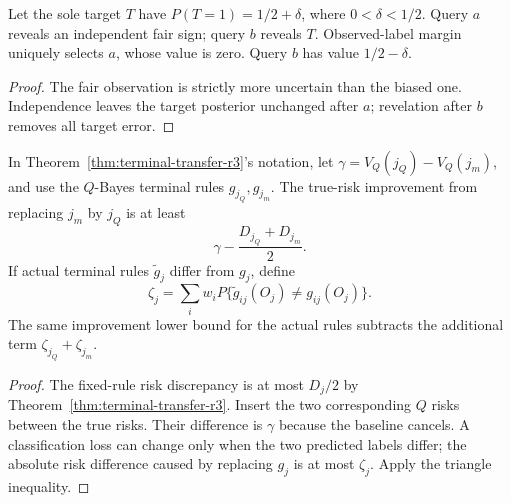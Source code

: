 \begin{counterexample}
Let the sole target $T$ have $P(T=1)=1/2+\delta$, where $0<\delta<1/2$.
Query $a$ reveals an independent fair sign; query $b$ reveals $T$.
Observed-label margin uniquely selects $a$, whose value is zero.
Query $b$ has value $1/2-\delta$.
\end{counterexample}
\begin{proof}
The fair observation is strictly more uncertain than the biased one.
Independence leaves the target posterior unchanged after $a$; revelation
after $b$ removes all target error.
\end{proof}

\begin{proposition}
\label{prop:improvement-r3}
In Theorem~\ref{thm:terminal-transfer-r3}'s notation, let
$\gamma=V_Q(j_Q)-V_Q(j_m)$, and use the $Q$-Bayes terminal rules
$g_{j_Q},g_{j_m}$. The true-risk improvement from replacing $j_m$ by
$j_Q$ is at least
\[
 \gamma-\frac{D_{j_Q}+D_{j_m}}2.
\]
If actual terminal rules $\widetilde g_j$ differ from $g_j$, define
\[
 \zeta_j=\sum_iw_iP\{\widetilde g_{ij}(O_j)\ne g_{ij}(O_j)\}.
\]
The same improvement lower bound for the actual rules subtracts the
additional term $\zeta_{j_Q}+\zeta_{j_m}$.
\end{proposition}
\begin{proof}
The fixed-rule risk discrepancy is at most $D_j/2$ by
Theorem~\ref{thm:terminal-transfer-r3}. Insert the two corresponding
$Q$ risks between the true risks. Their difference is $\gamma$ because
the baseline cancels. A classification loss can change only when the
two predicted labels differ; the absolute risk difference caused by
replacing $g_j$ is at most $\zeta_j$. Apply the triangle inequality.
\end{proof}


